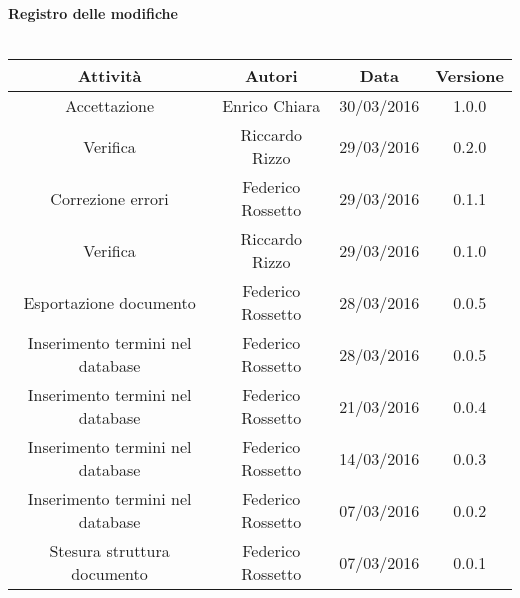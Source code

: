 \vspace{1cm}
   {\fontsize{15pt}{16pt}\selectfont \textbf{Registro delle modifiche}}\\ \\

\bgroup
\def\arraystretch{1.6}
\begin{tabular}{| c | c | c | c |}
\hline
\textbf{Attività} & \textbf{Autori} & \textbf{Data} & \textbf{Versione}\\ \hline \hline


Accettazione & Enrico Chiara & 30/03/2016 & 1.0.0 \\ \hline

Verifica & Riccardo Rizzo & 29/03/2016 & 0.2.0 \\ \hline  

Correzione errori & Federico Rossetto & 29/03/2016 & 0.1.1 \\ \hline

Verifica & Riccardo Rizzo & 29/03/2016 & 0.1.0 \\ \hline  

Esportazione documento & Federico Rossetto & 28/03/2016 & 0.0.5 \\ \hline  

Inserimento termini nel database & Federico Rossetto & 28/03/2016 & 0.0.5 \\ \hline  
  
Inserimento termini nel database & Federico Rossetto & 21/03/2016 & 0.0.4 \\ \hline  

Inserimento termini nel database & Federico Rossetto & 14/03/2016 & 0.0.3 \\ \hline

Inserimento termini nel database & Federico Rossetto & 07/03/2016 & 0.0.2 \\ \hline  

Stesura struttura documento & Federico Rossetto & 07/03/2016 & 0.0.1
\\ \hline 


\end{tabular}
\egroup
\newpage